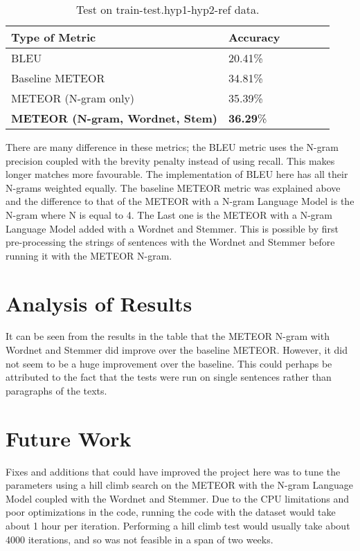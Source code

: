 \documentclass[11pt,letterpaper]{article}
\begin{document}
\begin{table}[h]
\begin{center}
\begin{tabular}{|l|l|l|l|rl|}
\hline \bf Type of Metric & \bf Accuracy\\ \hline
BLEU & 20.41\%\\
Baseline METEOR & 34.81\%\\
METEOR (N-gram only) & 35.39\% \\
\textbf{METEOR (N-gram, Wordnet, Stem)} & \textbf{36.29}\%\\
\hline
\end{tabular}
\end{center}
\caption{\label{font-table} Test on train-test.hyp1-hyp2-ref data. }
\end{table}


There are many difference in these metrics; the BLEU metric uses the N-gram precision coupled with the brevity penalty instead of using recall. This makes longer matches more favourable. The implementation of BLEU here has all their N-grams weighted equally. The baseline METEOR metric was explained above and the difference to that of the METEOR with a N-gram Language Model is the N-gram where N is equal to 4. The Last one is the METEOR with a N-gram Language Model added with a Wordnet and Stemmer. This is possible by first pre-processing the strings of sentences with the Wordnet and Stemmer before running it with the METEOR N-gram.




\section{Analysis of Results}

It can be seen from the results in the table that the METEOR N-gram with Wordnet and Stemmer did improve over the baseline METEOR. However, it did not seem to be a huge improvement over the baseline. This could perhaps be attributed to the fact that the tests were run on single sentences rather than paragraphs of the texts.

\section{Future Work}

Fixes and additions that could have improved the project here was to tune the parameters using a hill climb search on the METEOR with the N-gram Language Model coupled with the Wordnet and Stemmer. Due to the CPU limitations and poor optimizations in the code, running the code with the dataset would take about 1 hour per iteration. Performing a hill climb test would usually take about 4000 iterations, and so was not feasible in a span of two weeks.
\end{document}
